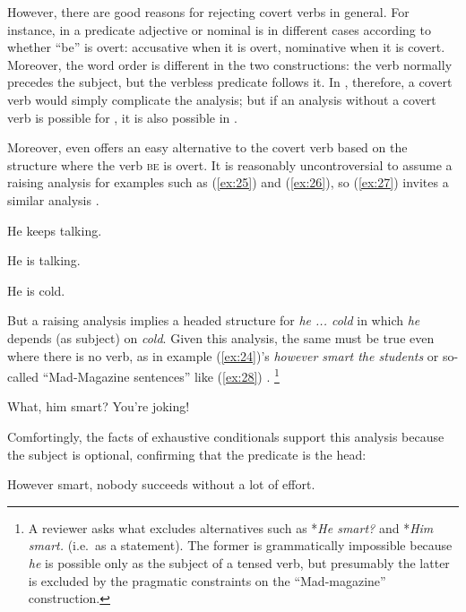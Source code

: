 \documentclass[output=paper
 	        ,biblatex
                ,babelshorthands
                ,newtxmath
                ,draftmode
                ,colorlinks, citecolor=brown
]{langscibook}
\begin{document}
However, there are good reasons for rejecting covert verbs in general. For instance, in 
a predicate adjective or nominal is in different cases according to whether ``be'' is overt:
accusative when it is overt, nominative when it is covert. Moreover, the word order is different in
the two constructions: the verb normally precedes the subject, but the verbless predicate follows
it. In , therefore, a covert verb would simply complicate the analysis; but if an
analysis without a covert verb is possible for , it is also possible in .

\largerpage
Moreover, even  offers an easy alternative to the covert verb based on the structure
where the verb \textsc{be} is overt. It is reasonably uncontroversial to assume a raising analysis
for examples such as (\ref{ex:25}) and (\ref{ex:26}), so (\ref{ex:27}) invites a similar analysis
\citep{MuellerPredication,MuellerCopula}.

\eal
\ex \label{ex:25} He keeps talking.

\ex \label{ex:26} He is talking.

\ex \label{ex:27} He is cold.
\zl

\noindent
But a raising analysis implies a headed structure for \emph{he ... cold} in which \emph{he} depends (as subject) on \emph{cold}. Given this analysis, the same must be true even where there is no verb, as in example (\ref{ex:24})'s \emph{however smart the students} or so-called ``Mad-Magazine sentences'' like (\ref{ex:28}) \citep{Lambrecht:90}.%
%
\footnote{A reviewer asks what excludes alternatives such as *\emph{He smart?} and *\emph{Him smart.} (i.e.\ as a statement). The former is grammatically impossible because \emph{he} is possible only as the subject of a tensed verb, but presumably the latter is excluded by the pragmatic constraints on the ``Mad-magazine'' construction.}%
%

\begin{exe}
	\ex \label{ex:28} What, him smart? You're joking!
\end{exe}

\noindent
Comfortingly, the facts of exhaustive conditionals support this analysis because the subject is
optional, confirming that the predicate is the head:

\begin{exe}
	\ex \label{ex:29} However smart, nobody succeeds without a lot of effort.
\end{exe}
\end{document}
